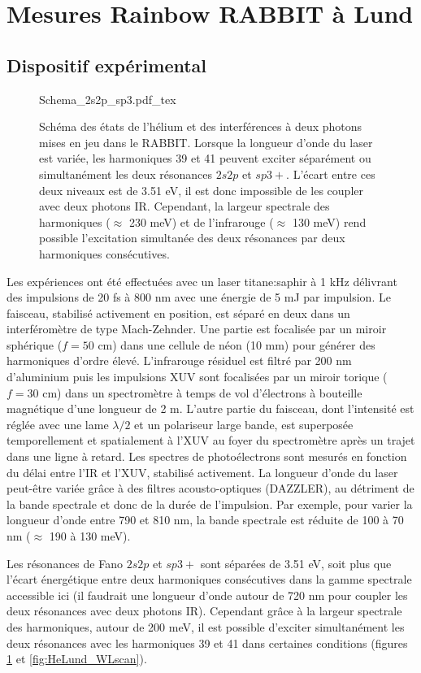 \section{Mesures Rainbow RABBIT à Lund}
\subsection{Dispositif expérimental}

\begin{figure}
\centering
\def\svgwidth{0.7\textwidth}
{Schema_2s2p_sp3.pdf_tex}
\caption{Schéma des états de l'hélium et des interférences à deux photons mises en jeu dans le RABBIT. Lorsque la longueur d'onde du laser est variée, les harmoniques 39 et 41 peuvent exciter séparément ou simultanément les deux résonances $2s2p$ et $sp3+$. L'écart entre ces deux niveaux est de 3.51 eV, il est donc impossible de les coupler avec deux photons IR. Cependant, la largeur spectrale des harmoniques ($\approx$ 230 meV) et de l'infrarouge ($\approx$ 130 meV) rend possible l'excitation simultanée des deux résonances par deux harmoniques consécutives.} 
\label{fig:Schema_2res}
\end{figure}

Les expériences ont été effectuées avec un laser titane:saphir à 1 kHz délivrant des impulsions de 20 fs à 800 nm avec une énergie de 5 mJ par impulsion. Le faisceau, stabilisé activement en position, est séparé en deux dans un interféromètre de type Mach-Zehnder. Une partie est focalisée par un miroir sphérique ($f = 50$ cm) dans une cellule de néon (10 mm) pour générer des harmoniques d'ordre élevé. L'infrarouge résiduel est filtré par 200 nm d'aluminium puis les impulsions XUV sont focalisées par un miroir torique ($f = 30$ cm) dans un spectromètre à temps de vol d'électrons à bouteille magnétique d'une longueur de 2 m. L'autre partie du faisceau, dont l'intensité est réglée avec une lame $\lambda /2$ et un polariseur large bande, est superposée temporellement et spatialement à l'XUV au foyer du spectromètre après un trajet dans une ligne à retard. Les spectres de photoélectrons sont mesurés en fonction du délai entre l'IR et l'XUV, stabilisé activement. La longueur d'onde du laser peut-être variée grâce à des filtres acousto-optiques (DAZZLER), au détriment de la bande spectrale et donc de la durée de l'impulsion. Par exemple, pour varier la longueur d'onde entre 790 et 810 nm, la bande spectrale est réduite de 100 à 70 nm ($\approx$ 190 à 130 meV).

Les résonances de Fano $2s2p$ et $sp3+$ sont séparées de 3.51 eV, soit plus que l'écart énergétique entre deux harmoniques consécutives dans la gamme spectrale accessible ici (il faudrait une longueur d'onde autour de 720 nm pour coupler les deux résonances avec deux photons IR). Cependant grâce à la largeur spectrale des harmoniques, autour de 200 meV, il est possible d'exciter simultanément les deux résonances avec les harmoniques 39 et 41 dans certaines conditions (figures \ref{fig:Schema_2res} et \ref{fig:HeLund_WLscan}).

